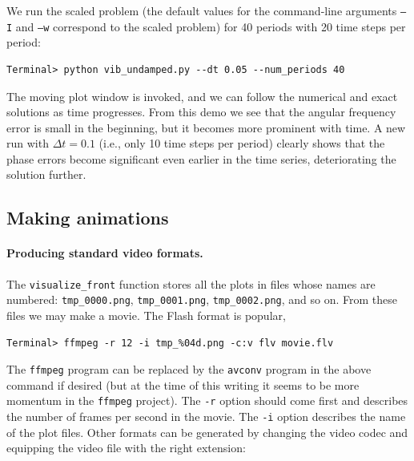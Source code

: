 \documentclass[%
oneside,                 %
final,                   %
10pt]{article}
\begin{document}
We run the scaled problem (the default values for the command-line arguments
\texttt{--I} and \texttt{--w} correspond to the scaled problem) for 40 periods with 20
time steps per period:

\begin{Verbatim}[frame=lines,label=\fbox{{\tiny Terminal}},framesep=2.5mm,framerule=0.7pt,fontsize=\fontsize{9pt}{9pt}]
Terminal> python vib_undamped.py --dt 0.05 --num_periods 40
\end{Verbatim}
The moving plot window is invoked, and we can follow the numerical and exact
solutions as time progresses. From this demo we see that
the angular frequency error is small in the beginning, but it becomes more
prominent with time. A new run with $\Delta t=0.1$ (i.e., only 10 time steps per period)
clearly shows that the phase errors become significant even earlier
in the time series, deteriorating the solution further.

\subsection{Making animations}
\label{vib:ode1:anim}


\paragraph{Producing standard video formats.}
The \Verb!visualize_front! function stores all the plots in
files whose names are numbered:
\Verb!tmp_0000.png!, \Verb!tmp_0001.png!, \Verb!tmp_0002.png!,
and so on. From these files we may make a movie. The Flash
format is popular,

\begin{Verbatim}[frame=lines,label=\fbox{{\tiny Terminal}},framesep=2.5mm,framerule=0.7pt,fontsize=\fontsize{9pt}{9pt}]
Terminal> ffmpeg -r 12 -i tmp_%04d.png -c:v flv movie.flv
\end{Verbatim}
The \texttt{ffmpeg} program can be replaced by the \texttt{avconv} program in
the above command if desired (but at the time of this writing it seems
to be more momentum in the \texttt{ffmpeg} project).
The \texttt{-r} option should come first and
describes the number of frames per second in the movie. The
\texttt{-i} option describes the name of the plot files.
Other formats can be generated by changing the video codec
and equipping the video file with the right extension:
\end{document}
